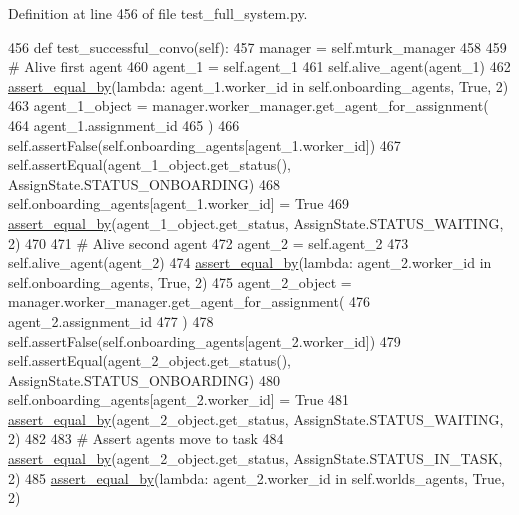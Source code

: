 Definition at line 456 of file test\+\_\+full\+\_\+system.\+py.


\begin{DoxyCode}
456     \textcolor{keyword}{def }test\_successful\_convo(self):
457         manager = self.mturk\_manager
458 
459         \textcolor{comment}{# Alive first agent}
460         agent\_1 = self.agent\_1
461         self.alive\_agent(agent\_1)
462         \hyperlink{namespaceparlai_1_1mturk_1_1core_1_1test_1_1test__full__system_a0b463246d35658a2e422010f13dcf819}{assert\_equal\_by}(\textcolor{keyword}{lambda}: agent\_1.worker\_id \textcolor{keywordflow}{in} self.onboarding\_agents, \textcolor{keyword}{True}, 2)
463         agent\_1\_object = manager.worker\_manager.get\_agent\_for\_assignment(
464             agent\_1.assignment\_id
465         )
466         self.assertFalse(self.onboarding\_agents[agent\_1.worker\_id])
467         self.assertEqual(agent\_1\_object.get\_status(), AssignState.STATUS\_ONBOARDING)
468         self.onboarding\_agents[agent\_1.worker\_id] = \textcolor{keyword}{True}
469         \hyperlink{namespaceparlai_1_1mturk_1_1core_1_1test_1_1test__full__system_a0b463246d35658a2e422010f13dcf819}{assert\_equal\_by}(agent\_1\_object.get\_status, AssignState.STATUS\_WAITING, 2)
470 
471         \textcolor{comment}{# Alive second agent}
472         agent\_2 = self.agent\_2
473         self.alive\_agent(agent\_2)
474         \hyperlink{namespaceparlai_1_1mturk_1_1core_1_1test_1_1test__full__system_a0b463246d35658a2e422010f13dcf819}{assert\_equal\_by}(\textcolor{keyword}{lambda}: agent\_2.worker\_id \textcolor{keywordflow}{in} self.onboarding\_agents, \textcolor{keyword}{True}, 2)
475         agent\_2\_object = manager.worker\_manager.get\_agent\_for\_assignment(
476             agent\_2.assignment\_id
477         )
478         self.assertFalse(self.onboarding\_agents[agent\_2.worker\_id])
479         self.assertEqual(agent\_2\_object.get\_status(), AssignState.STATUS\_ONBOARDING)
480         self.onboarding\_agents[agent\_2.worker\_id] = \textcolor{keyword}{True}
481         \hyperlink{namespaceparlai_1_1mturk_1_1core_1_1test_1_1test__full__system_a0b463246d35658a2e422010f13dcf819}{assert\_equal\_by}(agent\_2\_object.get\_status, AssignState.STATUS\_WAITING, 2)
482 
483         \textcolor{comment}{# Assert agents move to task}
484         \hyperlink{namespaceparlai_1_1mturk_1_1core_1_1test_1_1test__full__system_a0b463246d35658a2e422010f13dcf819}{assert\_equal\_by}(agent\_2\_object.get\_status, AssignState.STATUS\_IN\_TASK, 2)
485         \hyperlink{namespaceparlai_1_1mturk_1_1core_1_1test_1_1test__full__system_a0b463246d35658a2e422010f13dcf819}{assert\_equal\_by}(\textcolor{keyword}{lambda}: agent\_2.worker\_id \textcolor{keywordflow}{in} self.worlds\_agents, \textcolor{keyword}{True}, 2)

\end{DoxyCode}
